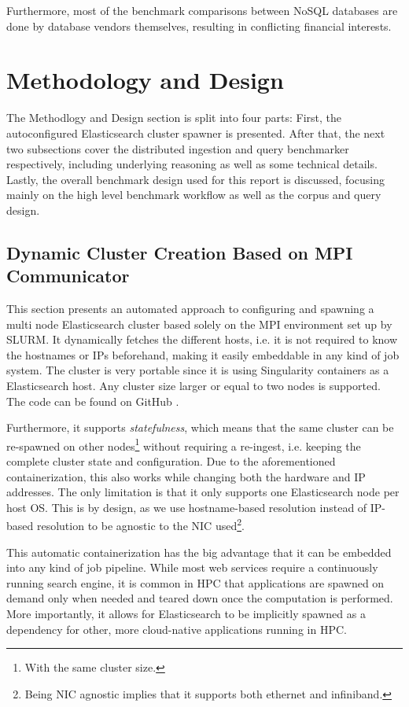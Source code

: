 Furthermore, most of the benchmark comparisons between NoSQL databases are done by database vendors themselves, resulting in conflicting financial interests.

\section{Methodology and Design}
The Methodlogy and Design section is split into four parts: First, the autoconfigured Elasticsearch cluster spawner is presented. After that, the next two subsections cover the distributed ingestion and query benchmarker respectively, including underlying reasoning as well as some technical details. Lastly, the overall benchmark design used for this report is discussed, focusing mainly on the high level benchmark workflow as well as the corpus and query design.

\subsection{Dynamic Cluster Creation Based on MPI Communicator}
This section presents an automated approach to configuring and spawning a multi node Elasticsearch cluster based solely on the \ac{MPI} environment set up by SLURM. It dynamically fetches the different hosts, i.e. it is not required to know the hostnames or IPs beforehand, making it easily embeddable in any kind of job system. The cluster is very portable since it is using Singularity \cite{singularity} containers as a Elasticsearch host. Any cluster size larger or equal to two nodes is supported. The code can be found on GitHub \cite{myspawner}.

Furthermore, it supports \emph{statefulness}, which means that the same cluster can be re-spawned on other nodes\footnote{With the same cluster size.} without requiring a re-ingest, i.e. keeping the complete cluster state and configuration. Due to the aforementioned containerization, this also works while changing both the hardware and IP addresses. The only limitation is that it only supports one Elasticsearch node per host OS. This is by design, as we use hostname-based resolution instead of IP-based resolution to be agnostic to the \ac{NIC} used\footnote{Being \ac{NIC} agnostic implies that it supports both ethernet and infiniband.}. 

This automatic containerization has the big advantage that it can be embedded into any kind of job pipeline. While most web services require a continuously running search engine, it is common in \ac{HPC} that applications are spawned on demand only when needed and teared down once the computation is performed. More importantly, it allows for Elasticsearch to be implicitly spawned as a dependency for other, more cloud-native applications running in \ac{HPC}.\\

